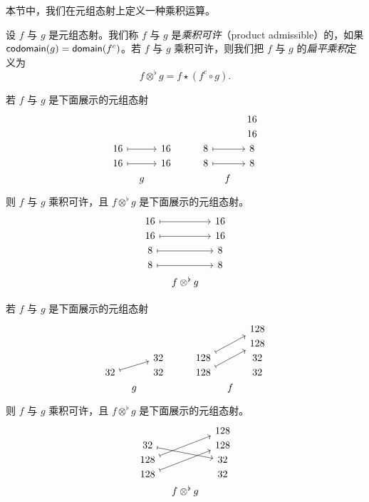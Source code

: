 本节中，我们在元组态射上定义一种乘积运算。
\begin{definition}
设 $f$ 与 $g$ 是元组态射。我们称 $f$ 与 $g$ 是{\it 乘积可许}（product admissible）的，如果 $\mathsf{codomain}(g) = \mathsf{domain}(f^c)$。若 $f$ 与 $g$ 乘积可许，则我们把 $f$ 与 $g$ 的{\it 扁平乘积}定义为
    \[
    f \otimes^\flat g = f \star (f^c \circ g).
    \]
\end{definition}



\begin{example}
    若 $f$ 与 $g$ 是下面展示的元组态射
    \[ \begin{tikzcd} [row sep = 1, column sep = 8]
      & & & & & & & 16\\
      & & & & & & & 16\\
     16 \ar[rr,mapsto] & & 16 & & & 8 \ar[rr,mapsto] & & 8\\
    16 \ar[rr,mapsto] & & 16 & & & 8 \ar[rr,mapsto] & & 8\\
    & g & & & & & f & \\
    \end{tikzcd} \]
    则
    $f$ 与 $g$ 乘积可许，且 $f \otimes^\flat g$ 是下面展示的元组态射。
    \[ \begin{tikzcd}[row sep = 1, column sep = 8]
    16 \ar[rr,mapsto] & & 16\\
    16 \ar[rr,mapsto] & & 16 \\
    8 \ar[rr,mapsto] & & 8\\
    8 \ar[rr,mapsto] & & 8 \\
    & f \otimes^\flat g &
    \end{tikzcd} \]
\end{example}

\begin{example}
    若 $f$ 与 $g$ 是下面展示的元组态射
    \[ \begin{tikzcd} [row sep = 1, column sep = 8]
      & & & & & & & 128\\
      & & & & & & & 128\\
      & & 32 & & & 128 \ar[uurr,mapsto] & & 32\\
    32 \ar[urr,mapsto] & & 32 & & & 128 \ar[uurr,mapsto] & & 32\\
    & g & & & & & f & \\
    \end{tikzcd} \]
    则
    $f$ 与 $g$ 乘积可许，且 $f \otimes^\flat g$ 是下面展示的元组态射。
    \[ \begin{tikzcd}[row sep = 1, column sep = 8]
     & & 128\\
    32 \ar[drr,mapsto] & & 128 \\
    128 \ar[uurr,mapsto] & & 32\\
    128 \ar[uurr,mapsto] & & 32 \\
    & f \otimes^\flat g &
    \end{tikzcd} \]
\end{example}


